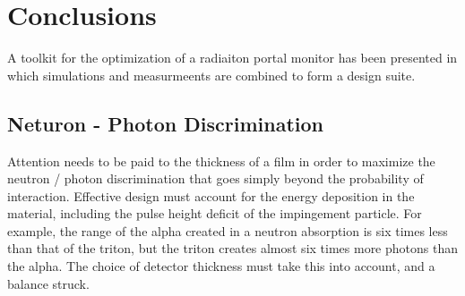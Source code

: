 \chapter{Conclusions}
\label{chap:Conclusions}
A toolkit for the optimization of a radiaiton portal monitor has been presented in which simulations and measurmeents are combined to form a design suite.

\section{Neturon - Photon Discrimination}
Attention needs to be paid to the thickness of a film in order to maximize the neutron / photon discrimination that goes simply beyond the probability of interaction.
Effective design must account for the energy deposition in the material, including the pulse height deficit of the impingement particle.
For example, the range of the alpha created in a  neutron absorption is six times less than that of the triton, but the triton creates almost six times more photons than the alpha.
The choice of detector thickness must take this into account, and a balance struck.
